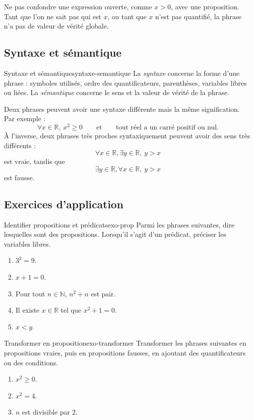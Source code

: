 \documentclass[11pt,a4paper]{article}
\newcommand{\R}{\mathbb{R}}
\newcommand{\N}{\mathbb{N}}
\begin{document}
\begin{erreurbox}
Ne pas confondre une expression ouverte, comme $x>0$, avec une proposition. Tant que l'on ne sait pas qui est $x$, ou tant que $x$ n'est pas quantifié, la phrase n'a pas de valeur de vérité globale.
\end{erreurbox}

\subsection{Syntaxe et sémantique}

\begin{definitionbox}{Syntaxe et sémantique}{syntaxe-semantique}
La \emph{syntaxe} concerne la forme d'une phrase : symboles utilisés, ordre des quantificateurs, parenthèses, variables libres ou liées. La \emph{sémantique} concerne le sens et la valeur de vérité de la phrase.
\end{definitionbox}

Deux phrases peuvent avoir une syntaxe différente mais la même signification. Par exemple :
\[
\forall x\in\R,\ x^2\geq 0
\qquad\text{et}\qquad
\text{tout réel a un carré positif ou nul.}
\]
À l'inverse, deux phrases très proches syntaxiquement peuvent avoir des sens très différents :
\[
\forall x\in\R,\exists y\in\R,\ y>x
\]
est vraie, tandis que
\[
\exists y\in\R,\forall x\in\R,\ y>x
\]
est fausse.

\subsection{Exercices d'application}

\begin{exercicebox}{Identifier propositions et prédicats}{exo-prop}
Parmi les phrases suivantes, dire lesquelles sont des propositions. Lorsqu'il s'agit d'un prédicat, préciser les variables libres.
\begin{enumerate}
  \item $3^2=9$.
  \item $x+1=0$.
  \item Pour tout $n\in\N$, $n^2+n$ est pair.
  \item Il existe $x\in\R$ tel que $x^2+1=0$.
  \item $x<y$.
\end{enumerate}
\end{exercicebox}

\begin{exercicebox}{Transformer en proposition}{exo-transformer}
Transformer les phrases suivantes en propositions vraies, puis en propositions fausses, en ajoutant des quantificateurs ou des conditions.
\begin{enumerate}
  \item $x^2\geq 0$.
  \item $x^2=4$.
  \item $n$ est divisible par $2$.
\end{enumerate}
\end{exercicebox}
\end{document}
